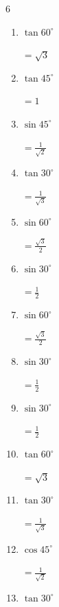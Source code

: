 \begin{multicols}{6}
\begin{enumerate}
        $\displaystyle =\frac{1}{\sqrt{3}}$

  \item $\displaystyle \tan{60^\circ}$

        $\displaystyle =\sqrt{3}$

  \item $\displaystyle \tan{45^\circ}$

        $\displaystyle =1$

  \item $\displaystyle \sin{45^\circ}$

        $\displaystyle =\frac{1}{\sqrt{2}}$

  \item $\displaystyle \tan{30^\circ}$

        $\displaystyle =\frac{1}{\sqrt{3}}$

  \item $\displaystyle \sin{60^\circ}$

        $\displaystyle =\frac{\sqrt{3}}{2}$

  \item $\displaystyle \sin{30^\circ}$

        $\displaystyle =\frac{1}{2}$

  \item $\displaystyle \sin{60^\circ}$

        $\displaystyle =\frac{\sqrt{3}}{2}$

  \item $\displaystyle \sin{30^\circ}$

        $\displaystyle =\frac{1}{2}$

  \item $\displaystyle \sin{30^\circ}$

        $\displaystyle =\frac{1}{2}$

  \item $\displaystyle \tan{60^\circ}$

        $\displaystyle =\sqrt{3}$

  \item $\displaystyle \tan{30^\circ}$

        $\displaystyle =\frac{1}{\sqrt{3}}$

  \item $\displaystyle \cos{45^\circ}$

        $\displaystyle =\frac{1}{\sqrt{2}}$

  \item $\displaystyle \tan{30^\circ}$


\end{enumerate}
\end{multicols}

